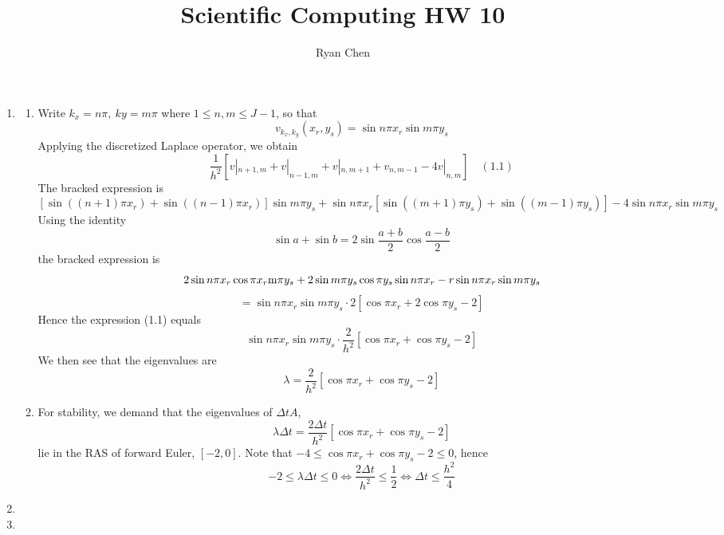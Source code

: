 \documentclass{article}
\title{Scientific Computing HW 10}
\author{Ryan Chen}
\newcommand{\sbr}[1]{\left[#1\right]}
\begin{document}
	
\maketitle



\begin{enumerate}
	
	
	
\item

\begin{enumerate}
	
	
	\item Write $k_x=n\pi,~ky=m\pi$ where $1\le n,m\le J-1$, so that
	$$v_{k_x,k_y}(x_r,y_s) = \sin n\pi x_r\sin m\pi y_s$$
	Applying the discretized Laplace operator, we obtain
	$$\frac{1}{h^2}\sbr{v|_{n+1,m}+v|_{n-1,m}+v|_{n,m+1}+v_{n,m-1}-4v|_{n,m}} \quad (1.1)$$
	The bracked expression is
	$$\sbr{\sin((n+1)\pi x_r)+\sin((n-1)\pi x_r)}\sin m\pi y_s + \sin n\pi x_r\sbr{\sin((m+1)\pi y_s)+\sin((m-1)\pi y_s)} - 4\sin n\pi x_r\sin m\pi y_s$$
	Using the identity
	$$\sin a + \sin b = 2\sin\frac{a+b}{2}\cos\frac{a-b}{2}$$
	the bracked expression is
	$$2\sin n\pi x_r\cos\pi x_r\si m\pi y_s + 2\sin m\pi y_s\cos\pi y_s\sin n\pi x_r - r\sin n\pi x_r\sin m\pi y_s$$
	$$= \sin n\pi x_r\sin m\pi y_s\cdot 2\sbr{\cos\pi x_r+2\cos\pi y_s-2}$$
	Hence the expression (1.1) equals
	$$\sin n\pi x_r\sin m\pi y_s\cdot \frac{2}{h^2}\sbr{\cos\pi x_r+\cos\pi y_s-2}$$
	We then see that the eigenvalues are
	$$\lambda = \frac{2}{h^2}\sbr{\cos\pi x_r+\cos\pi y_s-2}$$
	
	
	\item For stability, we demand that the eigenvalues of $\Delta tA$,
	$$\lambda\Delta t = \frac{2\Delta t}{h^2}[\cos\pi x_r+\cos\pi y_s-2]$$
	lie in the RAS of forward Euler, $[-2,0]$. Note that $-4\le\cos\pi x_r+\cos\pi y_s-2\le0$, hence
	$$-2 \le \lambda\Delta t \le 0
	\iff \frac{2\Delta t}{h^2} \le \frac12
	\iff \Delta t \le \frac{h^2}{4}$$ 
	
	
\end{enumerate}



\item



\item

\begin{enumerate}
	

\end{enumerate}
\end{enumerate}
\end{document}
